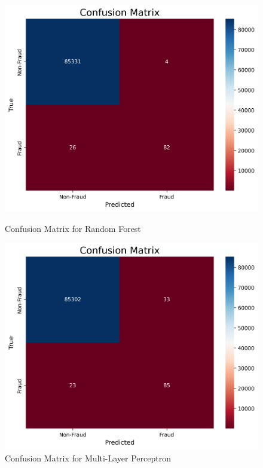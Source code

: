 \documentclass[11pt, oneside]{article}   	%
\begin{document}
\begin{figure}[H]
    \centering
    \begin{minipage}{0.49\textwidth}
        \centering
        \includegraphics[width=1.0\textwidth]{images/confusion_matrix_randomforest.png}
        \caption{Confusion Matrix for Random Forest}
        \label{fig:confusion_matrix_rf}
    \end{minipage}\hfill
    \begin{minipage}{0.49\textwidth}
        \centering
        \includegraphics[width=1.0\textwidth]{images/confusion_matrix_mlp.png}
        \caption{Confusion Matrix for Multi-Layer Perceptron}
        \label{fig:confusion_matrix_mlp}
    \end{minipage}
\end{figure}
\end{document}
